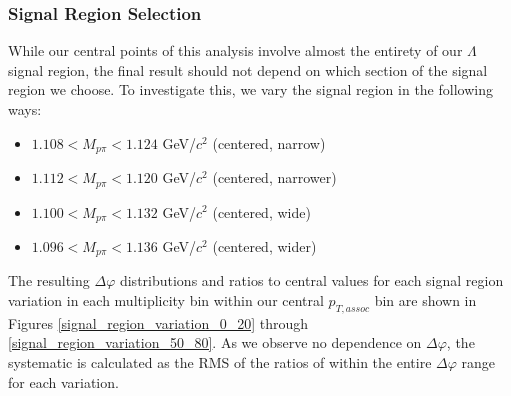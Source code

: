\documentclass[ALICE,manyauthors]{ALICE_analysis_notes}
\begin{document}
\subsubsection{Signal Region Selection}
While our central points of this analysis involve almost the entirety of our $\Lambda$ signal region, the final result should not depend on which section of the signal region we choose. To investigate this, we vary the signal region in the following ways:

\begin{itemize}
\item $1.108 < M_{p\pi} < 1.124$ GeV/$c^2$ (centered, narrow)
\item $1.112 < M_{p\pi} < 1.120$ GeV/$c^2$ (centered, narrower)
\item $1.100 < M_{p\pi} < 1.132$ GeV/$c^2$ (centered, wide)
\item $1.096 < M_{p\pi} < 1.136$ GeV/$c^2$ (centered, wider)
\end{itemize}

The resulting $\Delta\varphi$ distributions and ratios to central values for each signal region variation in each multiplicity bin within our central $p_{T, assoc}$ bin are shown in Figures \ref{signal_region_variation_0_20} through \ref{signal_region_variation_50_80}. As we observe no dependence on $\Delta\varphi$, the systematic is calculated as the RMS of the ratios of within the entire $\Delta\varphi$ range for each variation.
\end{document}
